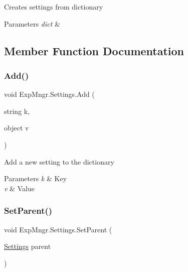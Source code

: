 Creates settings from dictionary 


\begin{DoxyParams}{Parameters}
{\em dict} & \\
\hline
\end{DoxyParams}


\subsection{Member Function Documentation}
\mbox{\label{class_exp_mngr_1_1_settings_ab573cccea6350b8b58cfd3e350aee41d}} 
\subsubsection{\texorpdfstring{Add()}{Add()}}
{\footnotesize\ttfamily void Exp\+Mngr.\+Settings.\+Add (\begin{DoxyParamCaption}\item[{string}]{k,  }\item[{object}]{v }\end{DoxyParamCaption})}



Add a new setting to the dictionary 


\begin{DoxyParams}{Parameters}
{\em k} & Key\\
\hline
{\em v} & Value\\
\hline
\end{DoxyParams}
\mbox{\label{class_exp_mngr_1_1_settings_afa9b02d35179ef8ca30dee3517e6e5bc}} 
\subsubsection{\texorpdfstring{Set\+Parent()}{SetParent()}}
{\footnotesize\ttfamily void Exp\+Mngr.\+Settings.\+Set\+Parent (\begin{DoxyParamCaption}\item[{\hyperlink{class_exp_mngr_1_1_settings}{Settings}}]{parent }\end{DoxyParamCaption})}



